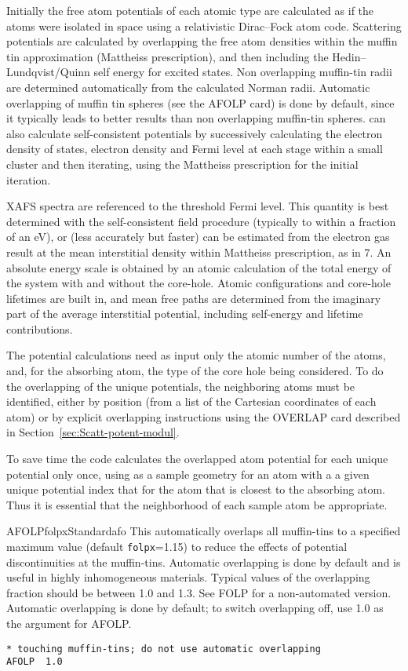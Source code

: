 \documentclass[11pt,oneside]{report} %
\begin{document}
Initially the free atom potentials of each atomic type are calculated
as if the atoms were isolated in space using a relativistic
Dirac--Fock atom code.  Scattering potentials are
calculated by overlapping the free atom densities within the muffin tin
approximation (Mattheiss prescription), and then including the
Hedin--Lundqvist/Quinn self energy for excited states.  Non
overlapping muffin-tin radii are determined automatically from
the calculated Norman radii.  Automatic overlapping of muffin tin
spheres (see the AFOLP card) is done by default, since it typically
leads to better results than non overlapping muffin-tin spheres.
{\feffcur} can also calculate self-consistent potentials by  successively
calculating the electron density of states, electron density and Fermi
level at each stage within a small cluster and then iterating, using
the Mattheiss prescription for the initial iteration.

XAFS spectra are referenced to the threshold Fermi level.  This
quantity is best determined with the self-consistent field procedure (typically
to within a fraction of an eV), or (less accurately but faster) can be
estimated from the electron
gas result at the mean interstitial density within Mattheiss prescription, as
in {\feff}7.  An absolute energy scale is obtained by an atomic
calculation of the total energy of the system with and without the
core-hole.  Atomic configurations and core-hole lifetimes are built
in, and mean free paths are determined from the imaginary part of the
average interstitial potential, including self-energy and lifetime
contributions.

The potential calculations need as input only the atomic number of the
atoms, and, for the absorbing atom, the type of the core hole being
considered.  To do the overlapping of the unique potentials, the
neighboring atoms must be identified, either by position (from a list
of the Cartesian coordinates of each atom) or by explicit overlapping
instructions using the OVERLAP card described in
Section~\ref{sec:Scatt-potent-modul}.

To save time the code calculates the overlapped atom potential for each
unique potential only once, using as a sample geometry for an atom with
a a given unique potential index that for the atom that is closest to
the absorbing atom.  Thus it is essential that the neighborhood of each
sample atom be appropriate.


\begin{Card}{AFOLP}{folpx}{Standard}{afo}
  This automatically overlaps all muffin-tins to a specified
  maximum value (default \texttt{folpx}=1.15) to reduce the effects of
  potential discontinuities at the muffin-tins.  Automatic overlapping
  is done by default and is useful in highly inhomogeneous materials.
  Typical values of the overlapping fraction should be between 1.0 and
  1.3.  See FOLP for a non-automated version.  Automatic overlapping
  is done by default; to switch overlapping off, use 1.0 as the
  argument for AFOLP.
\begin{verbatim}
* touching muffin-tins; do not use automatic overlapping
AFOLP  1.0
\end{verbatim}
\end{Card}
\end{document}
